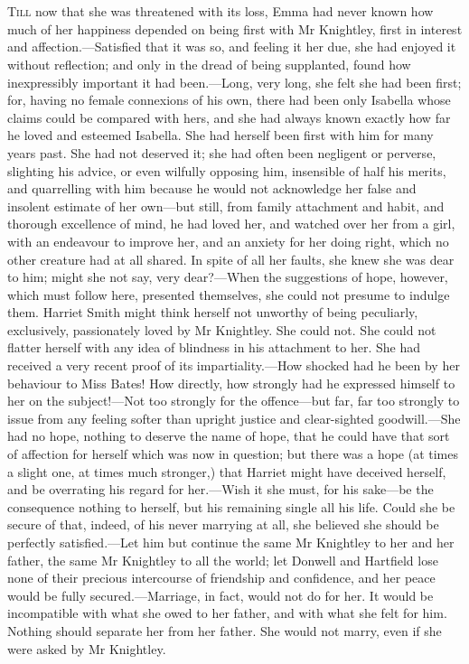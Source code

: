 \chapter[Chapter \thechapter]{}
\lettrine[lraise=0.3]{T}{ill} now that she was threatened with its loss, Emma had never known how much of her happiness depended on being first with Mr Knightley, first in interest and affection.—Satisfied that it was so, and feeling it her due, she had enjoyed it without reflection; and only in the dread of being supplanted, found how inexpressibly important it had been.—Long, very long, she felt she had been first; for, having no female connexions of his own, there had been only Isabella whose claims could be compared with hers, and she had always known exactly how far he loved and esteemed Isabella. She had herself been first with him for many years past. She had not deserved it; she had often been negligent or perverse, slighting his advice, or even wilfully opposing him, insensible of half his merits, and quarrelling with him because he would not acknowledge her false and insolent estimate of her own—but still, from family attachment and habit, and thorough excellence of mind, he had loved her, and watched over her from a girl, with an endeavour to improve her, and an anxiety for her doing right, which no other creature had at all shared. In spite of all her faults, she knew she was dear to him; might she not say, very dear?—When the suggestions of hope, however, which must follow here, presented themselves, she could not presume to indulge them. Harriet Smith might think herself not unworthy of being peculiarly, exclusively, passionately loved by Mr Knightley. She could not. She could not flatter herself with any idea of blindness in his attachment to her. She had received a very recent proof of its impartiality.—How shocked had he been by her behaviour to Miss Bates! How directly, how strongly had he expressed himself to her on the subject!—Not too strongly for the offence—but far, far too strongly to issue from any feeling softer than upright justice and clear-sighted goodwill.—She had no hope, nothing to deserve the name of hope, that he could have that sort of affection for herself which was now in question; but there was a hope (at times a slight one, at times much stronger,) that Harriet might have deceived herself, and be overrating his regard for her.—Wish it she must, for his sake—be the consequence nothing to herself, but his remaining single all his life. Could she be secure of that, indeed, of his never marrying at all, she believed she should be perfectly satisfied.—Let him but continue the same Mr Knightley to her and her father, the same Mr Knightley to all the world; let Donwell and Hartfield lose none of their precious intercourse of friendship and confidence, and her peace would be fully secured.—Marriage, in fact, would not do for her. It would be incompatible with what she owed to her father, and with what she felt for him. Nothing should separate her from her father. She would not marry, even if she were asked by Mr Knightley.

